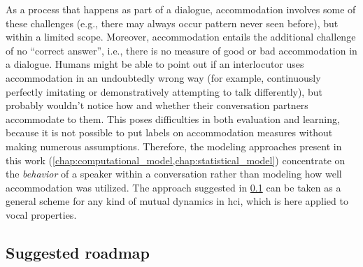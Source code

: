 As a process that happens as part of a dialogue, accommodation involves some of these challenges (e.g., there may always occur pattern never seen before), but within a limited scope.
Moreover, accommodation entails the additional challenge of no \enquote{correct answer}, i.e., there is no measure of good or bad accommodation in a dialogue.
Humans might be able to point out if an interlocutor uses accommodation in an undoubtedly wrong way (for example, continuously perfectly imitating or demonstratively attempting to talk differently), but probably wouldn't notice how and whether their conversation partners accommodate to them.
This poses difficulties in both evaluation and learning, because it is not possible to put labels on accommodation measures without making numerous assumptions.
Therefore, the modeling approaches present in this work (\cref{chap:computational_model,chap:statistical_model}) concentrate on the \emph{behavior} of a speaker within a conversation rather than modeling how well accommodation was utilized.
The approach suggested in \cref{subsec:suggested roadmap} can be taken as a general scheme for any kind of mutual dynamics in \ac{hci}, which is here applied to vocal properties.

\subsection{Suggested roadmap}
\label{subsec:suggested roadmap}


